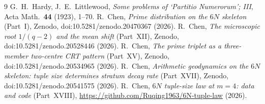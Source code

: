 \documentclass[11pt]{article}
\begin{document}
\begin{thebibliography}{9}
 G.~H.~Hardy, J.~E.~Littlewood, \emph{Some problems of `Partitio
Numerorum'; III}, Acta Math.\ \textbf{44} (1923), 1--70.
 R.~Chen, \emph{Prime distribution on the $6N$ skeleton} (Part~I),
Zenodo, doi:10.5281/zenodo.20470367 (2026).
 R.~Chen, \emph{The microscopic root $1/(q-2)$ and the mean
shift} (Part~XII), Zenodo, doi:10.5281/zenodo.20528446 (2026).
 R.~Chen, \emph{The prime triplet as a three-member two-centre
CRT pattern} (Part~XV), Zenodo, doi:10.5281/zenodo.20534965 (2026).
 R.~Chen, \emph{Arithmetic geodynamics on the $6N$ skeleton:
tuple size determines stratum decay rate} (Part~XVII), Zenodo,
doi:10.5281/zenodo.20541575 (2026).
 R.~Chen, \emph{$6N$ tuple-size law at $m=4$: data and code}
(Part~XVIII), \url{https://github.com/Ruqing1963/6N-tuple-law} (2026).
\end{thebibliography}
\end{document}
